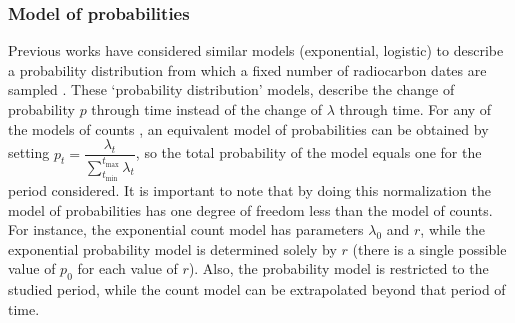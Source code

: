 \documentclass[a4paper]{article}
\begin{document}
\subsubsection*{Model of probabilities}

Previous works have considered similar models (exponential, logistic) to describe a probability distribution from which a fixed number of radiocarbon dates are sampled \parencite{Porcic2020, Crema2021b, Timpson2020}. These `probability distribution' models, describe the change of probability $p$ through time instead of the change of $\lambda$ through time. For any of the models of counts , an equivalent model of probabilities can be obtained by setting $p_t=\dfrac{\lambda_t}{ \displaystyle\sum\limits_{t_{\min}}^{t_{\max}} \lambda_t }$, so the total probability of the model equals one for the period considered. It is important to note that by doing this normalization the model of probabilities has one degree of freedom less than the  model of counts. For instance, the exponential count model has parameters $\lambda_0$ and $r$, while the exponential probability model is determined solely by $r$ (there is a single possible value of $p_0$ for each value of $r$). Also, the probability model is restricted to the studied period, while the count model can be extrapolated beyond that period of time.
\\





\end{document}
